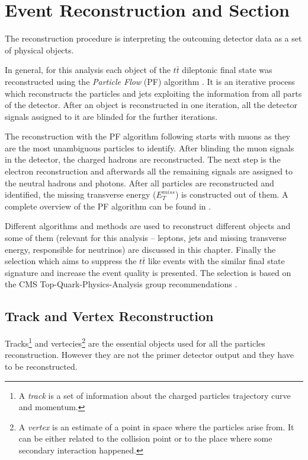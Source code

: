 \chapter{Event Reconstruction and Section}\label{chapt:event_selection}

The reconstruction procedure is interpreting the outcoming detector data as a set of physical objects.

In general, for this analysis each object of the $t\bar{t}$ dileptonic final state was reconstructed using the \textit{Particle Flow} (PF)
algorithm \cite{Beaudette:2014cea}. It is an iterative process which reconstructs the particles and jets exploiting the information from all parts
of the detector. After an object is reconstructed in one iteration, all the detector signals assigned to it are blinded for the further iterations.

The reconstruction with the PF algorithm following \cite{Beaudette:2014cea} starts with muons as they are the most unambiguous particles to identify.
After blinding the muon signals in the detector, the charged hadrons are reconstructed. The next step is the electron reconstruction and afterwards
all the remaining signals are assigned to the neutral hadrons and photons. After all particles are reconstructed and identified, the missing transverse
energy ($E_{T}^{miss}$) is constructed out of them. A complete overview of the PF algorithm can be found in \cite{CMS-PAS-PFT-09-001}. 

Different algorithms and methods are used to reconstruct different objects and some of them (relevant for this analysis -- leptons, jets and missing transverse
energy, responsible for neutrinos) are discussed in this chapter. Finally the selection which aims to suppress the $t\bar{t}$ like events
with the similar final state signature and increase the event quality is presented. The selection is based on the CMS Top-Quark-Physics-Analysis group recommendations \cite{TopPAGreco}.

\section{Track and Vertex Reconstruction}

Tracks\footnote{A \textit{track} is a set of information about the charged particles trajectory curve and momentum.} and vertecies\footnote{A 
\textit{vertex} is an estimate of a point in space where the particles arise from. It can be either related to the 
collision point or to the place  where some secondary interaction happened.} are the essential objects used for all the particles reconstruction. 
However they are not the primer detector output and they have to be reconstructed.

